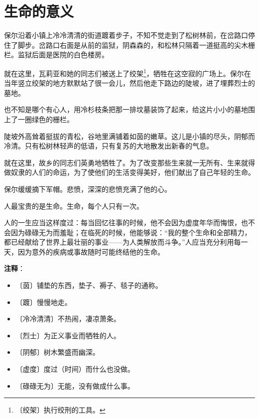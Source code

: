 \documentclass[12pt,UTF-8,openany]{ctexbook}
\begin{document}
\chapter{生命的意义}

\begin{normalsize}
    
    保尔沿着小镇上冷冷清清的街道踱着步子，不知不觉走到了松树林前，在岔路口停住了脚步。岔路口右面是从前的监狱，阴森森的，和松林只隔着一道挺高的尖木栅栏。监狱后面是医院的白色楼房。
    
    就在这里，瓦莉亚和她的同志们被送上了绞架\footnote{〔绞架〕执行绞刑的工具。}，牺牲在这空寂的广场上。保尔在当年竖立绞架的地方默默站了很一会儿，然后他走下路边的陡坡，进了埋葬烈士的墓地。
    
    也不知是哪个有心人，用冷杉枝条把那一排坟墓装饰了起来，给这片小小的墓地围上了一圈绿色的栅栏。
    
    陡坡外高耸着挺拔的青松，谷地里满铺着如茵的嫩草。这儿是小镇的尽头，阴郁而冷清。只有松树林轻声的低语，只有复苏的大地散发出新春的气息。
    
    就在这里，故乡的同志们英勇地牺牲了。为了改变那些生来就一无所有、生来就得做奴隶的人们的命运，为了使他们的生活变得美好，他们献出了自己年轻的生命。
    
    保尔缓缓摘下军帽。悲愤，深深的悲愤充满了他的心。
    
    人最宝贵的是生命。生命，每个人只有一次。
    
    人的一生应当这样度过：每当回忆往事的时候，他不会因为虚度年华而悔恨，也不会因为碌碌无为而羞耻；在临死的时候，他能够说：“我的整个生命和全部精力，都已经献给了世界上最壮丽的事业——为人类解放而斗争。”人应当充分利用每一天，因为意外的疾病或事故随时可能终结他的生命。
    
\end{normalsize}


\newpage

\textbf{注释}：

\vspace{-1em}

\begin{itemize}
    \setlength\itemsep{-0.2em}
    \item 〔茵〕铺垫的东西，垫子、褥子、毯子的通称。
    \item 〔踱〕慢慢地走。
    \item 〔冷冷清清〕不热闹，凄凉萧条。
    \item 〔烈士〕为正义事业而牺牲的人。
    \item 〔阴郁〕树木繁盛而幽深。
    \item 〔虚度〕度过（时间）而什么也没做。
    \item 〔碌碌无为〕无能，没有做成什么事。
\end{itemize}
\end{document}
